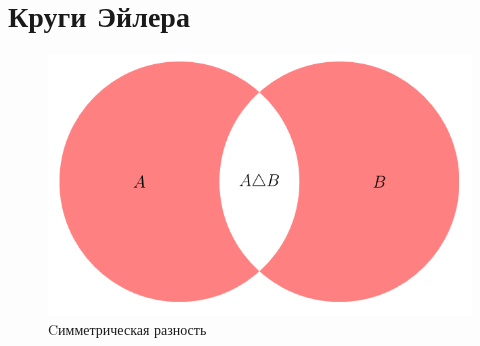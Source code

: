 \section{Круги Эйлера}
 \color{red}{\[ (A \cap B) \setminus (A \cup B)\]}
\begin{figure}[!ht]
\begin{center}
\includegraphics[scale=0.5]{fg.jpg}\caption{Cимметрическая разность}\label{figure1}
\end{center}
\end{figure}
